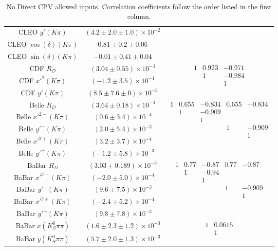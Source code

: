 \begin{table}[htdp]
\begin{center}
\begin{tabular}{|c|c|c|}
CLEO $y'(K\pi)$ & $(4.2\pm2.0\pm1.0)\times 10^{-2}$ & \\
CLEO $\cos(\delta)(K\pi)$ & $0.81\pm0.2\pm0.06$ & \\
CLEO $\sin(\delta)(K\pi)$ & $-0.01\pm0.41\pm0.04$ & \\
\hline
CDF $ R_D$ & $(3.04\pm0.55)\times 10^{-3}$ &\multirow{3}{*}{$\begin{array}{ccc}1 & 0.923 & -0.971 \\ & 1 & -0.984 \\ & & 1 \end{array}$}\\
CDF $ x'^2(K\pi)$ & $(-1.2\pm3.5)\times 10^{-4}$ & \\
CDF $y'(K\pi)$ & $(8.5\pm7.6\pm0)\times 10^{-3}$ & \\
\hline
Belle $ R_D$ & $(3.64\pm0.18)\times 10^{-3}$ &\multirow{5}{*}{$\begin{array}{ccccc} 
1 & 0.655& -0.834& 0.655& -0.834\\
 & 1 & -0.909 & & \\
 & & 1 & & \\
 & & & 1& -0.909 \\
& & & & 1
\end{array}$} \\
Belle $ x'^{2-}(K\pi)$ & $(0.6\pm3.4)\times 10^{-4}$ & \\
Belle $y'^-(K\pi)$ & $(2.0\pm5.4)\times 10^{-3}$ & \\
Belle $ x'^{2+}(K\pi)$ & $(3.2\pm3.7)\times 10^{-4}$ & \\
Belle $y'^+(K\pi)$ & $(-1.2\pm5.8)\times 10^{-3}$ & \\
\hline
BaBar $ R_D$ & $(3.03\pm0.189)\times 10^{-3}$ &\multirow{5}{*}{$\begin{array}{ccccc}
1 & 0.77 & -0.87 & 0.77 & -0.87 \\
 & 1 &-0.94 &  &  \\
   & & 1 & & \\
 & & & 1 &-0.909 \\
& & & & 1
 \end{array}$} \\
BaBar $ x'^{2-}(K\pi)$ & $(-2.0\pm5.0)\times 10^{-4}$ & \\
BaBar $y'^-(K\pi)$ & $(9.6\pm7.5)\times 10^{-3}$ & \\
BaBar $ x'^{2+}(K\pi)$ & $(-2.4\pm5.2)\times 10^{-4}$ & \\
BaBar $y'^+(K\pi)$ & $(9.8\pm7.8)\times 10^{-3}$ & \\
\hline
BaBar $x(K_S^0\pi\pi)$ & $(1.6\pm2.3\pm1.2)\times 10^{-3}$ & \multirow{2}{*}{$\begin{array}{cc} 1 & 0.0615 \\ & 1\end{array}$}\\
BaBar $y(K_S^0\pi\pi)$ & $(5.7\pm2.0\pm1.3)\times 10^{-3}$ & \\
\hline
\end{tabular}
\end{center}
\caption{No Direct CPV allowed inputs. Correlation coefficients follow the order listed
in the first column.}
\label{table:nodcpv_inputs}
\end{table}
